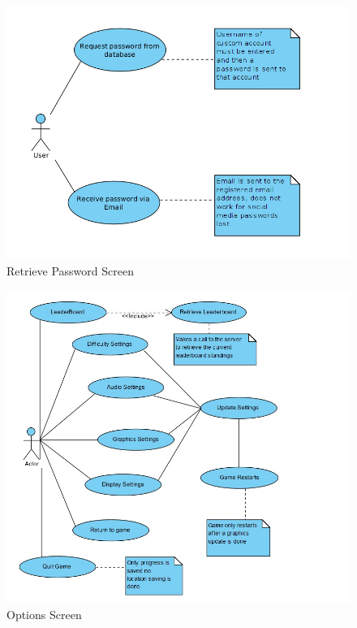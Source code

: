 \documentclass[letterpaper]{article}
\begin{document}
					\begin{figure}[H]
					\centering
					\includegraphics[width=140mm]{UML_Diagram/Use_Case/RetrievePassword_UseCase.jpg}
					\caption{Retrieve Password Screen}
					\end{figure}
				
					\begin{figure}[H]
					\centering
					\includegraphics[width=140mm]{UML_Diagram/Use_Case/OptionsScreen_UseCase.jpg}
					\caption{Options Screen}
					\end{figure}
				
\end{document}
